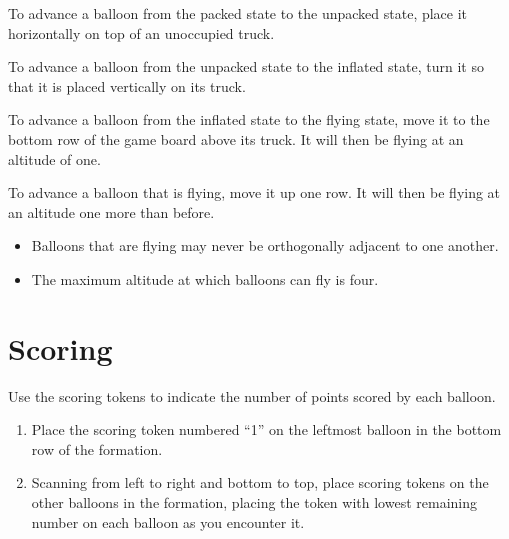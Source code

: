 \documentclass[a6paper, 11pt, parskip=half, DIV=15]{scrartcl}
\begin{document}
\begin{description}[leftmargin=0pt]
  \item[Unpack:] To advance a balloon from the packed state to the unpacked state, place it horizontally on top of an unoccupied  truck.
  \item[Inflate:] To advance a balloon from the unpacked state to the inflated state, turn it so that it is placed vertically on its truck.
  \item[Launch:] To advance a balloon from the inflated state to the flying state, move it to the bottom row of the game board above its truck. It will then be flying at an altitude of one.
  \item[Ascend:] To advance a balloon that is flying, move it up one row. It will then be flying at an altitude one more than before.
  \begin{itemize}
    \item Balloons that are flying may never be orthogonally adjacent to one another.%
    \item The maximum altitude at which balloons can fly is four.
  \end{itemize}
\end{description}

\newpage
\enlargethispage{1.75\baselineskip}
\section*{Scoring}

Use the scoring tokens to indicate the number of points scored by each balloon.
\begin{enumerate}
  \item Place the scoring token numbered ``1'' on the leftmost balloon in the bottom row of the formation.
  \item Scanning from left to right and bottom to top, place scoring tokens on the other balloons in the formation, placing the token with lowest remaining number on each balloon as you encounter it.
\end{enumerate}
\end{document}
